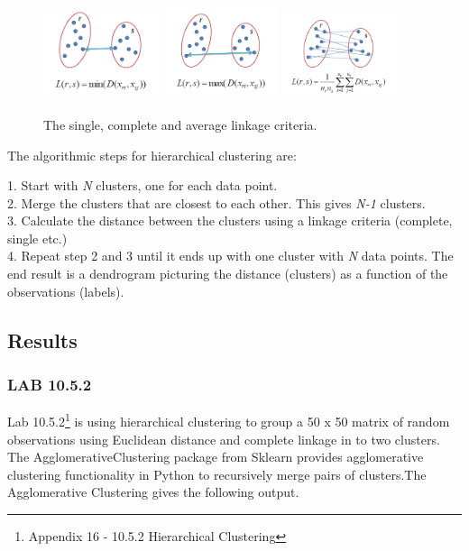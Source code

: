 \begin{figure}[H]
	\centering
	\includegraphics[width=0.3\textwidth]{clusteringMethods/hierarchicalclustering/fig/ClusteringSingle.png}
	\includegraphics[width=0.3\textwidth]{clusteringMethods/hierarchicalclustering/fig/ClusteringComplete.png}
	\includegraphics[width=0.3\textwidth]{clusteringMethods/hierarchicalclustering/fig/ClusteringAverage.png}
	\caption{The single, complete and average linkage criteria.}
	\label{fig:linkagecriteria}
\end{figure}

The algorithmic steps for hierarchical clustering are:

1. Start with \textit{N} clusters, one for each data point. \\
2. Merge the clusters that are closest to each other. This gives \textit{N-1} clusters. \\
3. Calculate the distance between the clusters using a linkage criteria (complete, single etc.) \\
4. Repeat step 2 and 3 until it ends up with one cluster with \textit{N} data points. The end result is a dendrogram picturing the distance (clusters) as a function of the observations (labels).

\subsection{Results}
\subsubsection*{LAB 10.5.2}
Lab 10.5.2\footnote{Appendix 16 - 10.5.2 Hierarchical Clustering} is using hierarchical clustering to group a 50 x 50 matrix of random observations using Euclidean distance and complete linkage in to two clusters. The AgglomerativeClustering package from Sklearn provides agglomerative clustering functionality in Python to recursively merge pairs of clusters.The Agglomerative Clustering gives the following output.

